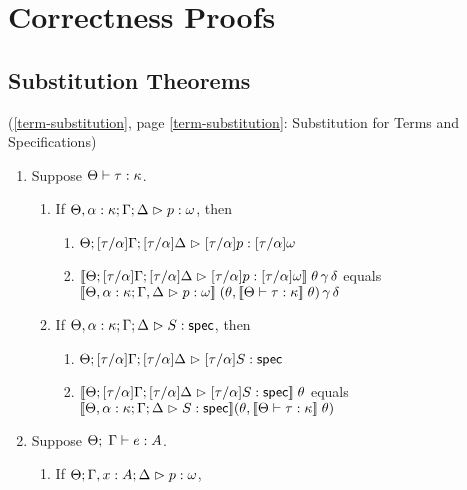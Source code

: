 \section{Correctness Proofs}

\subsection{Substitution Theorems}

\begin{lemma*}{(\ref{term-substitution}, page \ref{term-substitution}: Substitution for Terms and Specifications)}
\begin{enumerate}
\item Suppose $\judgeWK{\tau}{\kappa}$.
  \begin{enumerate}
  \item If $\judgeA[\Theta, \alpha:\kappa; \Gamma; \Delta]{p}{\omega}$, 
        then 
        \begin{enumerate}
        \item $\judgeA[\Theta; {[\tau/\alpha]}\Gamma; {[\tau/\alpha]}\Delta]{{[\tau/\alpha]}p}{{[\tau/\alpha]}\omega}$
        \item $\interp{\judgeA[\Theta; {[\tau/\alpha]}\Gamma; {[\tau/\alpha]}\Delta]{{[\tau/\alpha]}p}{{[\tau/\alpha]}\omega}}\;\theta\,\gamma\,\delta$ equals \\
          $\interp{\judgeA[\Theta, \alpha:\kappa; \Gamma, \Delta]{p}{\omega}}\;(\theta,\interp{\judgeWK{\tau}{\kappa}}\;\theta)\,\gamma\,\delta$
        \end{enumerate}
  \item If $\judgeS[\Theta, \alpha:\kappa; \Gamma; \Delta]{S}$, 
        then 
        \begin{enumerate}
        \item $\judgeS[\Theta; {[\tau/\alpha]}\Gamma; {[\tau/\alpha]}\Delta]{{[\tau/\alpha]}S}$
        \item $\interp{\judgeS[\Theta; {[\tau/\alpha]}\Gamma; {[\tau/\alpha]}\Delta]{{[\tau/\alpha]}S}}\;\theta$ equals \\
              $\interp{\judgeS[\Theta, \alpha:\kappa; \Gamma; \Delta]{S}}(\theta, \interp{\judgeWK{\tau}{\kappa}}\;\theta)$
        \end{enumerate}
  \end{enumerate}
\item Suppose $\judgeE{\Gamma}{e}{A}$.
  \begin{enumerate}
  \item If $\judgeA[\Theta; \Gamma, x:A; \Delta]{p}{\omega}$, 

\end{enumerate}
\end{enumerate}
\end{lemma*}
